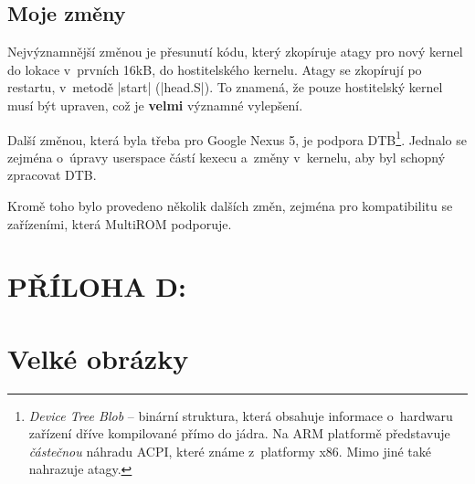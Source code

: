 \documentclass[12pt, a4paper, oneside]{article}
\newcommand{\B}{\textbf} %
\newcommand{\It}{\textit}  %
\begin{document}
\subsection*{Moje změny}
Nejvýznamnější změnou je přesunutí kódu, který zkopíruje atagy pro nový kernel do lokace v~prvních 16kB, do hostitelského kernelu. Atagy se zkopírují po restartu, v~metodě |start| (|head.S|). To znamená, že pouze hostitelský kernel musí být upraven, což je \B{velmi} významné vylepšení.

Další změnou, která byla třeba pro Google Nexus 5, je podpora DTB\footnote{\It{Device Tree Blob} -- binární struktura, která obsahuje informace o~hardwaru zařízení dříve kompilované přímo do jádra. Na ARM platformě představuje \It{částečnou} náhradu ACPI, které známe z~platformy x86. Mimo jiné také nahrazuje atagy.}. Jednalo se zejména o~úpravy userspace částí kexecu a~změny v~kernelu, aby byl schopný zpracovat DTB.

Kromě toho bylo provedeno několik dalších změn, zejména pro kompatibilitu se zařízeními, která MultiROM podporuje.


\newpage
\voffset=-80pt
\addtolength{\textheight}{70pt}
\addtolength{\footskip}{70pt}
 \section*{PŘÍLOHA D:}
 \section*{Velké obrázky}
 \label{sec:obrazky}
\end{document}
